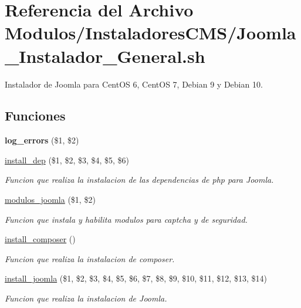 \hypertarget{Joomla__Instalador__General_8sh}{}\section{Referencia del Archivo Modulos/\+Instaladores\+C\+M\+S/\+Joomla\+\_\+\+Instalador\+\_\+\+General.sh}
\label{Joomla__Instalador__General_8sh}


Instalador de Joomla para Cent\+OS 6, Cent\+OS 7, Debian 9 y Debian 10.  


\subsection*{Funciones}
\begin{DoxyCompactItemize}
\item 
\mbox{\label{Joomla__Instalador__General_8sh_a92067b58a8478c9841b2cd9b75ea3565}} 
{\bfseries log\+\_\+errors} (\$1, \$2)
\item 
\hyperlink{Joomla__Instalador__General_8sh_a0def5b6b697b8869c4772673d56a5a4a}{install\+\_\+dep} (\$1, \$2, \$3, \$4, \$5, \$6)
\begin{DoxyCompactList}\small\item\em Funcion que realiza la instalacion de las dependencias de php para Joomla. \end{DoxyCompactList}\item 
\hyperlink{Joomla__Instalador__General_8sh_a3a17cfb1d7aa0bd1433900e4d4141cdb}{modulos\+\_\+joomla} (\$1, \$2)
\begin{DoxyCompactList}\small\item\em Funcion que instala y habilita modulos para captcha y de seguridad. \end{DoxyCompactList}\item 
\hyperlink{Joomla__Instalador__General_8sh_a9cbb91389a71b89c6cab0848d688e423}{install\+\_\+composer} ()
\begin{DoxyCompactList}\small\item\em Funcion que realiza la instalacion de composer. \end{DoxyCompactList}\item 
\hyperlink{Joomla__Instalador__General_8sh_a3a4814ecab9a481f63cd780e0099d050}{install\+\_\+joomla} (\$1, \$2, \$3, \$4, \$5, \$6, \$7, \$8, \$9, \$10, \$11, \$12, \$13, \$14)
\begin{DoxyCompactList}\small\item\em Funcion que realiza la instalacion de Joomla. \end{DoxyCompactList}\end{DoxyCompactItemize}


